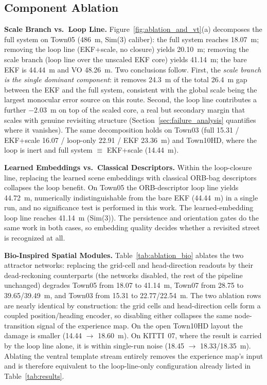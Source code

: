 \subsection{Component Ablation}
\label{sec:ablation}

\textbf{Scale Branch vs.\ Loop Line.} Figure~\ref{fig:ablation_and_vt}(a) decomposes the full system on Town05 (486~m, Sim(3) caliber): the full system reaches 18.07~m; removing the loop line (EKF+scale, no closure) yields 20.10~m; removing the scale branch (loop line over the unscaled EKF core) yields 41.14~m; the bare EKF is 44.44~m and VO 48.26~m. Two conclusions follow. First, the \emph{scale branch is the single dominant component}: it removes 24.3~m of the total 26.4~m gap between the EKF and the full system, consistent with the global scale being the largest monocular error source on this route. Second, the loop line contributes a further $-2.03$~m on top of the scaled core, a real but secondary margin that scales with genuine revisiting structure (Section~\ref{sec:failure_analysis} quantifies where it vanishes). The same decomposition holds on Town03 (full 15.31 / EKF+scale 16.07 / loop-only 22.91 / EKF 23.36~m) and Town10HD, where the loop is inert and full system $\equiv$ EKF+scale (14.44~m).

\textbf{Learned Embeddings vs.\ Classical Descriptors.} Within the loop-closure line, replacing the learned scene embeddings with classical ORB-bag descriptors collapses the loop benefit. On Town05 the ORB-descriptor loop line yields 44.72~m, numerically indistinguishable from the bare EKF (44.44~m) in a single run, and no significance test is performed in this work. The learned-embedding loop line reaches 41.14~m (Sim(3)). The persistence and orientation gates do the same work in both cases, so embedding quality decides whether a revisited street is recognized at all.

\textbf{Bio-Inspired Spatial Modules.} Table~\ref{tab:ablation_bio} ablates the two attractor networks: replacing the grid-cell and head-direction readouts by their dead-reckoning counterparts (the networks disabled, the rest of the pipeline unchanged) degrades Town05 from 18.07 to 41.14~m, Town07 from 28.75 to 39.65/39.49~m, and Town03 from 15.31 to 22.77/22.54~m. The two ablation rows are nearly identical by construction: the grid cells and head-direction cells form a coupled position/heading encoder, so disabling either collapses the same node-transition signal of the experience map. On the open Town10HD layout the damage is smaller (14.44 $\rightarrow$ 18.60~m). On KITTI~07, where the result is carried by the loop line alone, it is within single-run noise (18.45 $\rightarrow$ 18.33/18.35~m). Ablating the ventral template stream entirely removes the experience map's input and is therefore equivalent to the loop-line-only configuration already listed in Table~\ref{tab:results}.

